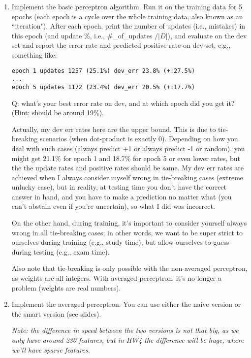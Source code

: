 \documentclass[11pt]{article}
\begin{document}
\begin{enumerate}

\item Implement the basic perceptron algorithm. Run it 
on the training data for 5 epochs (each epoch is a cycle over the whole training data, also known as an ``iteration").
After each epoch, 
{print the number of updates (i.e., mistakes) in this epoch (and update \%, i.e., \#\_of\_updates $/ |D|$),} and evaluate on the dev set and report the error rate and predicted positive rate on dev set, e.g., something like:

\begin{verbatim}
epoch 1 updates 1257 (25.1%) dev_err 23.8% (+:27.5%) 
...
epoch 5 updates 1172 (23.4%) dev_err 20.5% (+:17.7%) 
\end{verbatim}

Q: what's your best error rate on dev, and at which epoch did you get it? 
(Hint: should be around 19\%).

{{Actually, my dev err rates here are the upper bound.
This is due to tie-breaking scenarios (when dot-product is exactly 0).
Depending on how you deal with such cases (always predict +1 or always predict -1 or random), you might get 21.1\% for epoch 1 and 18.7\% for epoch 5 or even lower rates, 
but the the update rates and positive rates should be same.
My dev err rates are achieved when I always consider myself wrong in tie-breaking cases (extreme unlucky case), but in reality, at testing time you don't have the correct answer in hand, and you have to make a prediction no matter what (you can't abstain even if you're uncertain), so what I did was incorrect. 


On the other hand, during training, it's important to consider yourself always wrong in all tie-breaking cases; in other words, we want to be super strict to ourselves during training (e.g., study time), but  allow ourselves to guess during testing (e.g., exam time).

Also note that tie-breaking is only possible with the non-averaged perceptron, as weights are all integers. With averaged perceptron, it's no longer a problem (weights are real numbers).
}}

\item Implement the averaged perceptron. You can use either the naive version or the smart version (see slides). 

{\em Note: the difference in speed between the two versions is not that big, as we only have around 230 features, but in HW4  the difference will be huge, where we'll have sparse features.} %


\end{enumerate}
\end{document}
